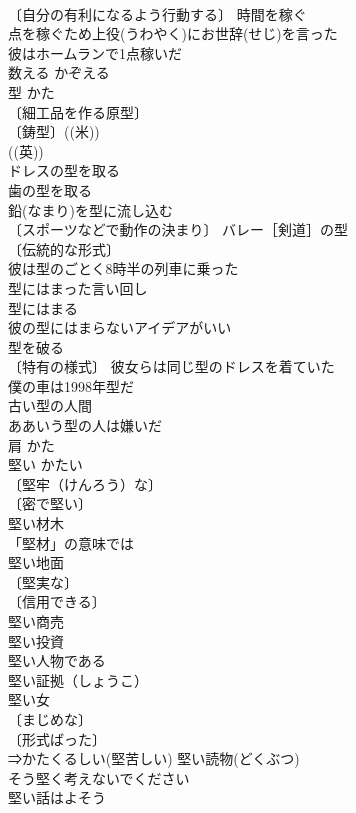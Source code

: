\documentclass[8pt]{extreport}
\begin{document}
\begin{CJK}{UTF8}{min}
\\	〔自分の有利になるよう行動する〕 時間を稼ぐ 
\\	点を稼ぐため上役(うわやく)にお世辞(せじ)を言った 
\\	彼はホームランで1点稼いだ 
\\	数える	かぞえる	
\\	型	かた	
\\	〔細工品を作る原型〕
\\	〔鋳型〕((米)) 
\\	((英)) 
\\	ドレスの型を取る 
\\	歯の型を取る 
\\	鉛(なまり)を型に流し込む 
\\	〔スポーツなどで動作の決まり〕 バレー［剣道］の型 
\\	〔伝統的な形式〕
\\	彼は型のごとく8時半の列車に乗った 
\\	型にはまった言い回し 
\\	型にはまる　
\\	彼の型にはまらないアイデアがいい 
\\	型を破る 
\\	〔特有の様式〕 彼女らは同じ型のドレスを着ていた 
\\	僕の車は1998年型だ 
\\	古い型の人間 
\\	ああいう型の人は嫌いだ 
\\	肩	かた	
\\	堅い	かたい	
\\	〔堅牢（けんろう）な〕
\\	〔密で堅い〕
\\	堅い材木 
\\	「堅材」の意味では
\\	堅い地面 
\\	〔堅実な〕
\\	〔信用できる〕
\\	堅い商売 
\\	堅い投資 
\\	堅い人物である 
\\	堅い証拠（しょうこ） 
\\	堅い女 
\\	〔まじめな〕
\\	〔形式ばった〕
\\	⇒かたくるしい(堅苦しい) 堅い読物(どくぶつ) 
\\	そう堅く考えないでください 
\\	堅い話はよそう 

\end{CJK}
\end{document}
